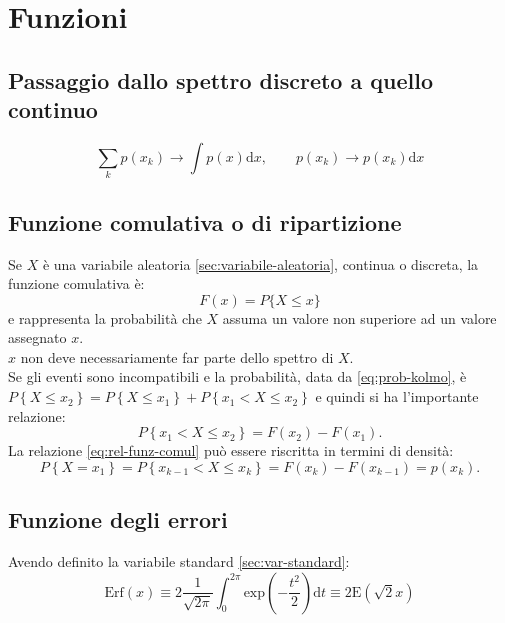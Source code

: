 \chapter{Funzioni} %
\section{Passaggio dallo spettro discreto a quello continuo} %
\label{sec:pass-spettro}
\begin{equation}
\sum _{ k }{ p({ x }_{ k }) } \rightarrow \int { p(x)\textrm{d}x } ,\qquad p({ x }_{ k })\rightarrow p({ x }_{ k })\textrm{d}x
\end{equation}

\section{Funzione comulativa o di ripartizione} %
\label{sec:comulativa}
Se $X$ è una variabile aleatoria \ref{sec:variabile-aleatoria}, continua o discreta, la funzione comulativa è:
\begin{equation}
F(x)=P\{ X\le x\} 
\end{equation}
e rappresenta la probabilità che $X$ assuma un valore non superiore ad un valore assegnato $x$. \\ $x$ non deve necessariamente far parte dello spettro di $X$. \\Se gli eventi sono incompatibili e la probabilità, data da \ref{eq:prob-kolmo}, è $P\left\{ X\le x_{ 2 } \right\} =P\left\{ X\le x_{ 1 } \right\} +P\left\{ x_{ 1 }<X\le x_{ 2 } \right\} $ e quindi si ha l'importante relazione:
\begin{equation}
\label{eq:rel-funz-comul}
P\left\{ x_{ 1 }<X\le x_{ 2 } \right\} =F\left( x_{ 2 } \right) -F\left( x_{ 1 } \right) .
\end{equation} 
La relazione \ref{eq:rel-funz-comul} può essere riscritta in termini di densità:
\begin{equation}
\label{eq:rel-funz-comul-densità}
P\left\{ X=x_{ 1 } \right\} =P\left\{ x_{ k-1 }<X\le x_{ k } \right\} =F\left( x_{ k } \right) -F\left( x_{ k-1 } \right) =p\left( x_{ k } \right) .
\end{equation}

\section{Funzione degli errori} %
\label{sec:funz-errori}
Avendo definito la variabile standard \ref{sec:var-standard}:
\begin{equation}
\textrm{Erf}\left( x \right) \equiv 2\frac { 1 }{ \sqrt { 2\pi  }  } \int _{ 0 }^{ 2\pi  }{ \textrm{exp}\left( -\frac { { t }^{ 2 } }{ 2 }  \right) \textrm{d}t } \equiv 2\textrm{E}\left( \sqrt { 2 } x \right) 
\end{equation}

